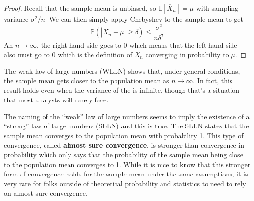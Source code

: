 \documentclass[
  letterpaper,
  DIV=11,
  numbers=noendperiod]{scrreprt}
\newcommand{\E}{\mathbb{E}}
\renewcommand{\P}{\mathbb{P}}
\newcommand{\Xbar}{\overline{X}}
\theoremstyle{definition}
\theoremstyle{plain}
\theoremstyle{definition}
\theoremstyle{remark}
\begin{document}
\begin{proof}

Recall that the sample mean is unbiased, so \(\E[\Xbar_n] = \mu\) with
sampling variance \(\sigma^2/n\). We can then simply apply Chebyshev to
the sample mean to get \[
\P(|\Xbar_n - \mu| \geq \delta) \leq \frac{\sigma^2}{n\delta^2}
\] An \(n\rightarrow\infty\), the right-hand side goes to 0 which means
that the left-hand side also must go to 0 which is the definition of
\(\Xbar_n\) converging in probability to \(\mu\).

\end{proof}

The weak law of large numbers (WLLN) shows that, under general
conditions, the sample mean gets closer to the population mean as
\(n\rightarrow\infty\). In fact, this result holds even when the
variance of the is infinite, though that's a situation that most
analysts will rarely face.

\begin{tcolorbox}[enhanced jigsaw, title=\textcolor{quarto-callout-note-color}{\faInfo}\hspace{0.5em}{Note}, breakable, titlerule=0mm, opacityback=0, rightrule=.15mm, bottomrule=.15mm, colframe=quarto-callout-note-color-frame, coltitle=black, colbacktitle=quarto-callout-note-color!10!white, bottomtitle=1mm, toptitle=1mm, colback=white, arc=.35mm, opacitybacktitle=0.6, toprule=.15mm, leftrule=.75mm, left=2mm]

The naming of the ``weak'' law of large numbers seems to imply the
existence of a ``strong'' law of large numbers (SLLN) and this is true.
The SLLN states that the sample mean converges to the population mean
with probability 1. This type of convergence, called \textbf{almost sure
convergence}, is stronger than convergence in probability which only
says that the probability of the sample mean being close to the
population mean converges to 1. While it is nice to know that this
stronger form of convergence holds for the sample mean under the same
assumptions, it is very rare for folks outside of theoretical
probability and statistics to need to rely on almost sure convergence.

\end{tcolorbox}
\end{document}
